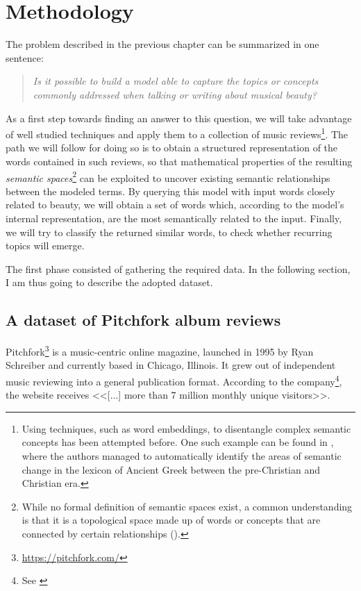\chapter{Methodology}\label{ch:methodology}

The problem described in the previous chapter can be summarized in one sentence:

\begin{quote}
\begin{center}
\emph{Is it possible to build a model able to capture the topics or concepts commonly addressed when talking or writing about musical beauty?}
\end{center}
\end{quote}

As a first step towards finding an answer to this question, we will take advantage of well studied  techniques and apply them to a collection of music reviews\footnote{Using  techniques, such as word embeddings, to disentangle complex semantic concepts has been attempted before. One such example can be found in \cite{rodda2016panta}, where the authors managed to automatically identify the areas of
semantic change in the lexicon of Ancient Greek between the pre-Christian and Christian
era.}. The path we will follow for doing so is to obtain a structured representation of the words contained in such reviews, so that mathematical properties of the resulting \emph{semantic spaces}\footnote{While no formal definition of semantic spaces exist, a common understanding is that it is a topological space made up of words or concepts that are connected by certain relationships (\cite{masucci2011wikipedia}).} can be exploited to uncover existing semantic relationships between the modeled terms. By querying this model with input words closely related to beauty, we will obtain a set of words which, according to the model's internal representation, are the most semantically related to the input. Finally, we will try to classify the returned similar words, to check whether recurring topics will emerge.

The first phase consisted of gathering the required data. In the following section, I am thus going to describe the adopted dataset.

\section{A dataset of Pitchfork album reviews}
Pitchfork\footnote{\url{https://pitchfork.com/}} is a music-centric online magazine, launched in 1995 by Ryan Schreiber and currently based in Chicago, Illinois. It grew out of independent music reviewing into a general publication format. According to the company\footnote{See \cite{pitchfork}}, the website receives <<[...] more than 7 million monthly unique visitors>>.

